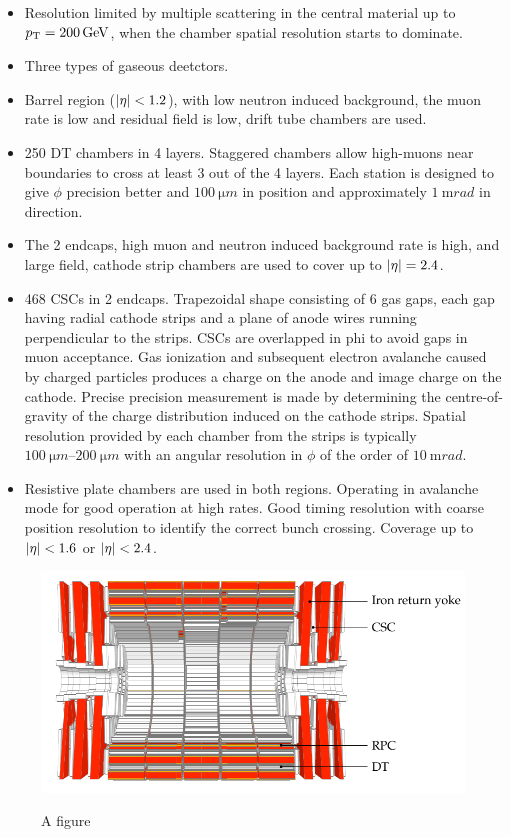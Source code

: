 \begin{itemize}
    \item Resolution limited by multiple scattering in the central material
        up to $p_{\text{T}}=\SI{200}{GeV}$, when the chamber spatial resolution starts
        to dominate.
    \item Three types of gaseous deetctors.
    \item Barrel region (${|\eta|<1.2}$), with low neutron induced background,
        the muon rate is low and residual field is low, drift tube chambers are
        used.
    \item 250 DT chambers in 4 layers. Staggered chambers allow high-\pt muons
        near boundaries to cross at least 3 out of the 4 layers. Each station is
        designed to give $\phi$ precision better and ${\SI{100}{\micro m}}$ in
        position and approximately ${\SI{1}{\milli rad}}$ in direction.
    \item The 2 endcaps, high muon and neutron induced background rate is high,
        and large field, cathode strip chambers are used to cover up to
        ${{|\eta|}=2.4}$.
    \item 468 CSCs in 2 endcaps. Trapezoidal shape consisting of 6 gas gaps,
        each gap having radial cathode strips and a plane of anode wires running
        perpendicular to the strips. CSCs are overlapped in phi to avoid gaps
        in muon acceptance. Gas ionization and subsequent electron avalanche
        caused by charged particles produces a charge on the anode and image
        charge on the cathode. Precise precision measurement is made by
        determining the centre-of-gravity of the charge distribution induced on
        the cathode strips. Spatial resolution provided by each chamber from the
        strips is typically ${\SIrange{100}{200}{\micro m}}$ with an angular
        resolution in $\phi$ of the order of ${\SI{10}{\milli rad}}$.
    \item Resistive plate chambers are used in both regions. Operating
        in avalanche mode for good operation at high rates. Good timing
        resolution with coarse position resolution to identify the correct
        bunch crossing. Coverage up to ${|\eta|<1.6}$ or ${|\eta|<2.4}$.
\end{itemize}

\begin{figure}[htbp]
    \centering
    \includegraphics{diagrams/tikz/cms/annotated/cms_muons.pdf}
    \label{fig:cms-muons}
    \caption{
        A figure
    }
\end{figure}

